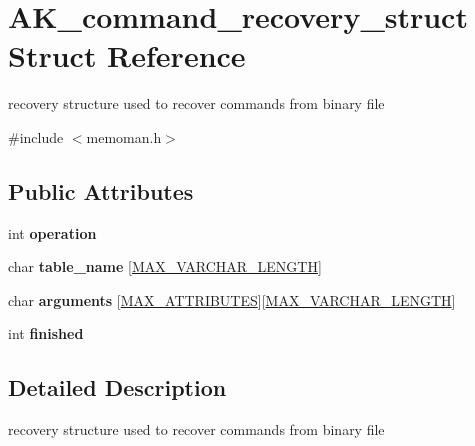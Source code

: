\hypertarget{structAK__command__recovery__struct}{}\section{A\+K\+\_\+command\+\_\+recovery\+\_\+struct Struct Reference}
\label{structAK__command__recovery__struct}


recovery structure used to recover commands from binary file  




{\ttfamily \#include $<$memoman.\+h$>$}

\subsection*{Public Attributes}
\begin{DoxyCompactItemize}
\item 
\mbox{\label{structAK__command__recovery__struct_a18dc268f00bb5f619e36f2f9fda39dc9}} 
int {\bfseries operation}
\item 
\mbox{\label{structAK__command__recovery__struct_abf5ccb78d890b9b22ac09c9d7f5d33a4}} 
char {\bfseries table\+\_\+name} \mbox{[}\hyperlink{constants_8h_a9de30df5b4220028fba997e5def2e9d7}{M\+A\+X\+\_\+\+V\+A\+R\+C\+H\+A\+R\+\_\+\+L\+E\+N\+G\+TH}\mbox{]}
\item 
\mbox{\label{structAK__command__recovery__struct_aa60b19195568d63f8d2f13622cd60f88}} 
char {\bfseries arguments} \mbox{[}\hyperlink{constants_8h_a4d992a1f9192388588184753115f6c03}{M\+A\+X\+\_\+\+A\+T\+T\+R\+I\+B\+U\+T\+ES}\mbox{]}\mbox{[}\hyperlink{constants_8h_a9de30df5b4220028fba997e5def2e9d7}{M\+A\+X\+\_\+\+V\+A\+R\+C\+H\+A\+R\+\_\+\+L\+E\+N\+G\+TH}\mbox{]}
\item 
\mbox{\label{structAK__command__recovery__struct_afd3e63cdc5e49ff2f3b3ed73d73e2a96}} 
int {\bfseries finished}
\end{DoxyCompactItemize}


\subsection{Detailed Description}
recovery structure used to recover commands from binary file 

